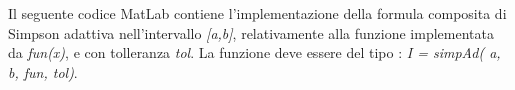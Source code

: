 Il seguente codice MatLab contiene l'implementazione della formula composita di Simpson adattiva nell'intervallo \textit{[a,b]}, relativamente alla funzione implementata da \textit{fun(x)}, e con tolleranza \textit{tol}. La funzione deve essere del tipo : \textit{I = simpAd( a, b, fun, tol)}.\\\
